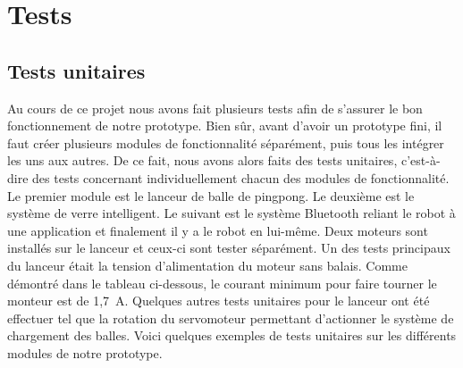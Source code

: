 \section{Tests}




\subsection{Tests unitaires}

Au cours de ce projet nous avons fait plusieurs tests afin de s’assurer le bon fonctionnement de notre prototype.
Bien sûr, avant d’avoir un prototype fini, il faut créer plusieurs modules de fonctionnalité séparément, puis tous les intégrer les uns aux autres.
De ce fait, nous avons alors faits des tests unitaires, c’est-à-dire des tests concernant individuellement chacun des modules de fonctionnalité.
Le premier module est le lanceur de balle de pingpong.
Le deuxième est le système de verre intelligent.
Le suivant est le système Bluetooth reliant le robot à une application et finalement il y a le robot en lui-même.
Deux moteurs sont installés sur le lanceur et ceux-ci sont tester séparément.
Un des tests principaux du lanceur était la tension d’alimentation du moteur sans balais.
Comme démontré dans le tableau ci-dessous, le courant minimum pour faire tourner le monteur est de 1,7~A.
Quelques autres tests unitaires pour le lanceur ont été effectuer tel que la rotation du servomoteur permettant d’actionner le système de chargement des balles.
Voici quelques exemples de tests unitaires sur les différents modules de notre prototype.


